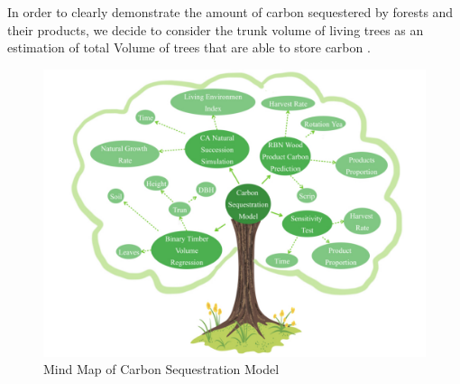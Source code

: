 \documentclass{mcmthesis}
\numberwithin{figure}{section}
\numberwithin{table}{section}
\numberwithin{equation}{section}
\begin{document}
In order to clearly demonstrate the amount of carbon sequestered by forests and their
products, we decide to consider the trunk volume of living trees as an estimation of 
total Volume of trees that are able to store carbon \citep{WangYan}. 
\par
\begin{figure}[htbp]
  \centering
  \includegraphics[width = 14cm]{code&pic/采伐率mindmap.pdf}
  \caption{Mind Map of Carbon Sequestration Model}
\end{figure}
\end{document}
